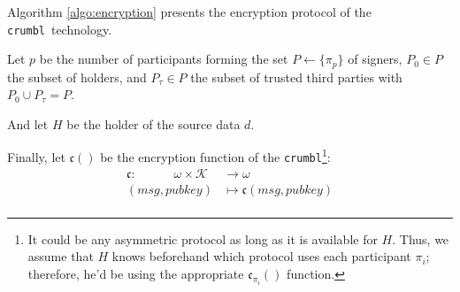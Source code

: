 \documentclass[twoside,twocolumn]{article}
\theoremstyle{definition}
\theoremstyle{remark}
\begin{document}
Algorithm \ref{algo:encryption} presents the encryption protocol of the \texttt{crumbl}\textregistered~technology.

\vspace{1em} %

Let $p$ be the number of participants forming the set $P \gets \{ \pi_p\}$ of signers, $P_0 \in P$ the subset of holders, and $P_\tau \in P$ the subset 
of trusted third parties with $P_0 \cup P_\tau = P$.

And let $H$ be the holder of the source data $d$.

Finally, let $\mathfrak{c}()$ be the encryption function of the \texttt{crumbl}\footnote{It could be any asymmetric protocol as long as it is available 
for $H$. Thus, we assume that $H$ knows beforehand which protocol uses each participant $\pi_i$; therefore, he'd be using the appropriate 
$\mathfrak{c}_{\pi_i}()$ function.}:
\begin{equation}
    \label{eq:encrypt}
    \begin{array}{rl}
        \mathfrak{c}: \qquad \quad \omega \times \mathcal{K} &\to \omega \\
                (msg, pubkey) &\mapsto \mathfrak{c}(msg, pubkey) \\
    \end{array}
\end{equation}
\end{document}
